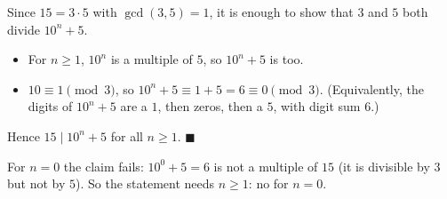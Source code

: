 Since $15=3\cdot5$ with $\gcd(3,5)=1$, it is enough to show that $3$ and $5$ both divide $10^n+5$.
\begin{itemize}
\item For $n\ge1$, $10^n$ is a multiple of $5$, so $10^n+5$ is too.
\item $10\equiv1\pmod3$, so $10^n+5\equiv1+5=6\equiv0\pmod3$. (Equivalently, the digits of $10^n+5$ are a $1$, then zeros, then a $5$, with digit sum $6$.)
\end{itemize}
Hence $15\mid10^n+5$ for all $n\ge1$. $\blacksquare$

For $n=0$ the claim fails: $10^0+5=6$ is not a multiple of $15$ (it is divisible by $3$ but not by $5$). So the statement needs $n\ge1$: $\boxed{\text{no}}$ for $n=0$.

